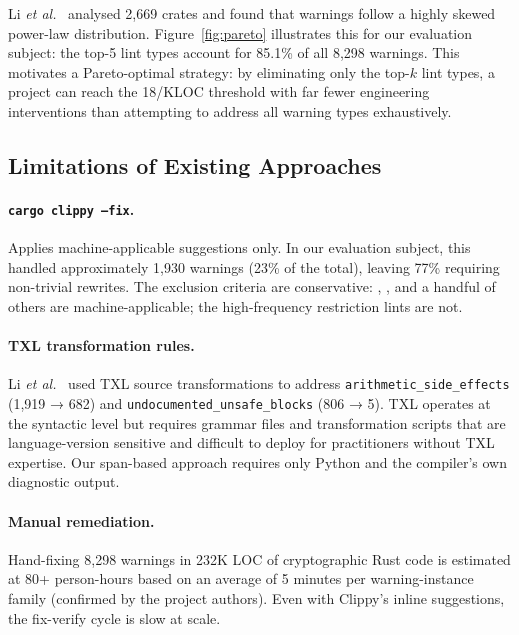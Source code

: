 \documentclass[sigconf,review,anonymous]{acmart}
\newcommand{\etal}{\textit{et al.}\xspace}
\newcommand{\tcode}{\path}
\begin{document}
Li \etal~\cite{li2023unleash} analysed 2,669 crates and found that
warnings follow a highly skewed power-law distribution.
Figure~\ref{fig:pareto} illustrates this for our evaluation subject:
the top-5 lint types account for 85.1\% of all 8,298 warnings.
This motivates a Pareto-optimal strategy: by eliminating only the top-$k$
lint types, a project can reach the 18/KLOC threshold with far fewer
engineering interventions than attempting to address all warning types
exhaustively.

\subsection{Limitations of Existing Approaches}

\paragraph{\texttt{cargo clippy --fix}.}
Applies machine-applicable suggestions only.
In our evaluation subject, this handled approximately 1,930 warnings
(23\% of the total), leaving 77\% requiring non-trivial rewrites.
The exclusion criteria are conservative: \tcode{cast\_lossless},
\tcode{ptr\_as\_ptr}, and a handful of others are machine-applicable;
the high-frequency restriction lints are not.

\paragraph{TXL transformation rules.}
Li \etal~\cite{li2023unleash} used TXL source transformations to address
\texttt{arithmetic\_side\_effects} (1,919 → 682) and
\texttt{undocumented\_unsafe\_blocks} (806 → 5).
TXL operates at the syntactic level but requires grammar files and
transformation scripts that are language-version sensitive and
difficult to deploy for practitioners without TXL expertise.
Our span-based approach requires only Python and the compiler's own
diagnostic output.

\paragraph{Manual remediation.}
Hand-fixing 8,298 warnings in 232K LOC of cryptographic Rust code is
estimated at 80+ person-hours based on an average of 5 minutes per
warning-instance family (confirmed by the project authors).
Even with Clippy's inline suggestions, the fix-verify cycle is slow at scale.

\end{document}
